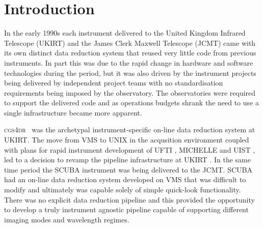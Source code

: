 \documentclass[final,authoryear,5p,times,twocolumn]{elsarticle}
\begin{document}

\newcommand{\mnras}{MNRAS}
\newcommand{\aap}{A\&A}
\newcommand{\aaps}{A\&AS}
\newcommand{\pasp}{PASP}
\newcommand{\apj}{ApJ}
\newcommand{\apjs}{ApJS}
\newcommand{\qjras}{QJRAS}
\newcommand{\an}{Astron.\ Nach.}
\newcommand{\ijimw}{Int.\ J.\ Infrared \& Millimeter Waves}
\newcommand{\procspie}{Proc.\ SPIE}
\newcommand{\aspconf}{ASP Conf. Ser.}


\newcommand{\recipe}{\emph{Recipe}}
\newcommand{\recipes}{\emph{Recipes}}
\newcommand{\primitive}{\emph{Primitive}}
\newcommand{\primitives}{\emph{Primitives}}
\newcommand{\Frame}{\emph{Frame}}
\newcommand{\Group}{\emph{Group}}
\newcommand{\Index}{\emph{index}}

\newcommand{\oracdr}{\textsc{orac-dr}}
\newcommand{\cgsdr}{\textsc{cgs}{\footnotesize 4}\textsc{dr}}

\newcommand{\ascl}[1]{\href{http://www.ascl.net/#1}{ascl:#1}}


\section{Introduction}

In the early 1990s each instrument delivered to the United Kingdom
Infrared Telescope (UKIRT) and the James Clerk Maxwell Telescope (JCMT) came
with its own distinct data reduction system that reused very little
code from previous instruments. In part this was due to the rapid
change in hardware and software technologies during the period, but it
was also driven by the instrument projects being delivered
by independent project teams with no standardisation requirements
being imposed by the observatory. The observatories were required to
support the delivered code and as operations budgets shrank the need
to use a single infrastructure became more apparent.

\cgsdr\
\citep[][\ascl{1406.013}]{1992ASPC...25..479S,1996ASPC...87..223D} was
the archetypal instrument-specific on-line data reduction system at
UKIRT. The move from VMS to UNIX in the acqusition environment coupled
with plans for rapid instrument development of UFTI
\citep{2003SPIE.4841..901R}, MICHELLE \citep{1993ASPC...41..401G} and
UIST \citep{2004SPIE.5492.1160R}, led to a decision to revamp the
pipeline infrastructure at UKIRT \citep{1998ASPC..145..196E}. In the
same time period the SCUBA instrument \citep{1999MNRAS.303..659H} was
being delivered to the JCMT. SCUBA had an on-line data reduction
system developed on VMS that was difficult to modify and ultimately
was capable solely of simple quick-look functionality. There was no explicit
data reduction pipeline and this provided the opportunity to develop a
truly instrument agnostic pipeline capable of supporting different
imaging modes and wavelength regimes.
\end{document}

